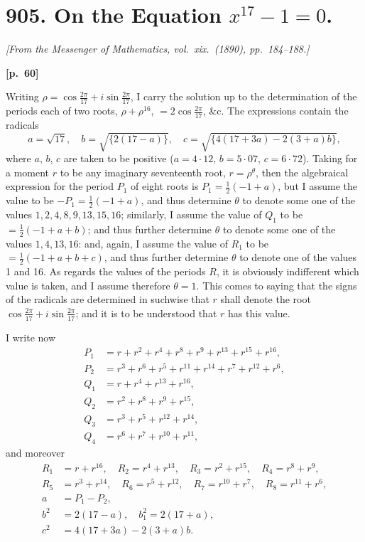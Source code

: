 \documentclass[11pt,a4paper]{book}
\begin{document}
\section*{905. On the Equation $x^{17} - 1 = 0$.}

\noindent\textit{[From the Messenger of Mathematics, vol.\ xix.\ (1890), pp.\ 184--188.]}

\vspace{0.5em}
\noindent\textbf{[p.\ 60]}

Writing $\rho = \cos\frac{2\pi}{17} + i\sin\frac{2\pi}{17}$, I carry the solution up to the determination of the periods each of two roots, $\rho + \rho^{16}$, $= 2\cos\frac{2\pi}{17}$, \&c. The expressions contain the radicals
$$
a = \sqrt{17}, \quad b = \sqrt{\{2(17 - a)\}}, \quad c = \sqrt{\{4(17 + 3a) - 2(3 + a)b\}},
$$
where $a$, $b$, $c$ are taken to be positive ($a = 4\cdot 12$, $b = 5\cdot 07$, $c = 6\cdot 72$). Taking for a moment $r$ to be any imaginary seventeenth root, $r = \rho^\theta$, then the algebraical expression for the period $P_1$ of eight roots is $P_1 = \frac{1}{2}(-1 + a)$, but I assume the value to be $-P_1 = \frac{1}{2}(-1 + a)$, and thus determine $\theta$ to denote some one of the values $1, 2, 4, 8, 9, 13, 15, 16$; similarly, I assume the value of $Q_1$ to be $= \frac{1}{2}(-1 + a + b)$; and thus further determine $\theta$ to denote some one of the values $1, 4, 13, 16$: and, again, I assume the value of $R_1$ to be $= \frac{1}{2}(-1 + a + b + c)$, and thus further determine $\theta$ to denote one of the values 1 and 16. As regards the values of the periods $R$, it is obviously indifferent which value is taken, and I assume therefore $\theta = 1$. This comes to saying that the signs of the radicals are determined in suchwise that $r$ shall denote the root $\cos\frac{2\pi}{17} + i\sin\frac{2\pi}{17}$; and it is to be understood that $r$ has this value.

I write now
\begin{align*}
P_1 &= r + r^2 + r^4 + r^8 + r^9 + r^{13} + r^{15} + r^{16}, \\
P_2 &= r^3 + r^6 + r^5 + r^{11} + r^{14} + r^7 + r^{12} + r^6, \\
Q_1 &= r + r^4 + r^{13} + r^{16}, \\
Q_2 &= r^2 + r^8 + r^9 + r^{15}, \\
Q_3 &= r^3 + r^5 + r^{12} + r^{14}, \\
Q_4 &= r^6 + r^7 + r^{10} + r^{11},
\end{align*}
and moreover
\begin{align*}
R_1 &= r + r^{16}, \quad R_2 = r^4 + r^{13}, \quad R_3 = r^2 + r^{15}, \quad R_4 = r^8 + r^9, \\
R_5 &= r^3 + r^{14}, \quad R_6 = r^5 + r^{12}, \quad R_7 = r^{10} + r^7, \quad R_8 = r^{11} + r^6, \\
a &= P_1 - P_2, \\
b^2 &= 2(17 - a), \quad b_1^2 = 2(17 + a), \\
c^2 &= 4(17 + 3a) - 2(3 + a)b.
\end{align*}
\end{document}
